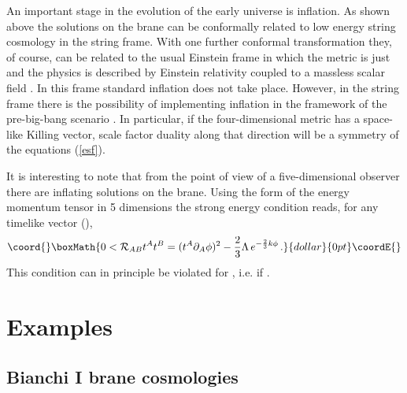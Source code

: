 \documentclass[prd,a4paper,twocolumn,superscriptaddress,nofootinbib,showpacs]{revtex4}
\begin{document}
An important stage in the evolution of the early universe is 
inflation. 
As shown above the solutions on the brane can be conformally related
to low energy string cosmology in the string frame. With one
further conformal transformation they, of course, can be
related to the usual Einstein frame in which the metric is just \coordHE{} and
the physics is described by Einstein relativity coupled to a massless
scalar field \coordHE{}. In this frame standard inflation
does not take place. However, in the string frame there is
the possibility of implementing inflation in the framework
of the pre-big-bang scenario \cite{gab}. In particular, if the four-dimensional
metric has a space-like Killing vector, scale factor duality along that direction
will be a symmetry of the equations (\ref{esf}). 

It is interesting to note that from the point of view of a
five-dimensional observer there are inflating solutions on the
brane. Using the form of the energy momentum tensor in 5 dimensions
the strong energy condition reads, for any timelike vector \coordHE{} (\coordHE{}),
$$\coord{}\boxMath{
0<\CR_{AB}t^At^B=(t^A\partial_{A}\phi)^2-{2\over3}\Lambda\, e^{-{2\over 3}k\phi}\, .
}{dollar}{0pt}\coordE{}$$
This condition can in principle be violated for \coordHE{}, i.e.
if \coordHE{}.








\section{Examples}

\subsection{Bianchi I brane cosmologies}
\end{document}
